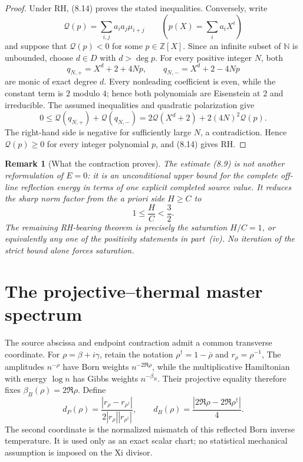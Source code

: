 \documentclass[11pt]{article}
\newtheorem{remark}[theorem]{Remark}
\begin{document}
\begin{proof}
Under RH, (8.14) proves the stated inequalities.  Conversely, write
\[
 \mathcal Q(p)=\sum_{i,j}a_i a_j\mu_{i+j}
 \qquad\left(p(X)=\sum_i a_iX^i\right)
\]
and suppose that $\mathcal Q(p)<0$ for some $p\in\mathbb Z[X]$.  Since an infinite subset of
$\mathbb N$ is unbounded, choose $d\in D$ with $d>\deg p$.  For every positive integer $N$, both
\[
 q_{N,+}=X^d+2+4Np,\qquad q_{N,-}=X^d+2-4Np
\]
are monic of exact degree $d$.  Every nonleading coefficient is even, while the constant term is
$2$ modulo $4$; hence both polynomials are Eisenstein at $2$ and irreducible.  The assumed
inequalities and quadratic polarization give
\[
 0\le \mathcal Q(q_{N,+})+\mathcal Q(q_{N,-})
   =2\mathcal Q(X^d+2)+2(4N)^2\mathcal Q(p).
\]
The right-hand side is negative for sufficiently large $N$, a contradiction.  Hence
$\mathcal Q(p)\ge0$ for every integer polynomial $p$, and (8.14) gives RH.
\end{proof}

\begin{remark}[What the contraction proves]
\label{rem:contraction-boundary}
The estimate \textup{(8.9)} is not another reformulation of $E=0$: it is an unconditional upper
bound for the complete off-line reflection energy in terms of one explicit completed source
value.  It reduces the sharp norm factor from the a priori side $H\ge C$ to
\[
 1\le\frac HC<\frac32.
\]
The remaining RH-bearing theorem is precisely the saturation $H/C=1$, or equivalently any one
of the positivity statements in part~\textup{(iv)}.  No iteration of the strict bound alone forces
saturation.
\end{remark}

\section{The projective--thermal master spectrum}
\label{sec:projective-thermal}

The source abscissa and endpoint contraction admit a common transverse coordinate.  For
$\rho=\beta+i\gamma$, retain the notation $\rho^\dagger=1-\overline\rho$ and $r_\rho=\rho^{-1}$,
The amplitudes $n^{-\rho}$ have Born weights $n^{-2\Re\rho}$, while the multiplicative
Hamiltonian with energy $\log n$ has Gibbs weights $n^{-\beta_B}$.  Their projective equality
therefore fixes $\beta_B(\rho)=2\Re\rho$.  Define
\[
 d_P(\rho)=\frac{|r_\rho-r_{\rho^\dagger}|}
 {2|r_\rho||r_{\rho^\dagger}|},
 \qquad
 d_B(\rho)=\frac{|2\Re\rho-2\Re\rho^\dagger|}{4}.
 \tag{9.1}
\]
The second coordinate is the normalized mismatch of this reflected Born inverse temperature.  It
is used only as an exact scalar chart; no statistical mechanical assumption is imposed on the Xi
divisor.
\end{document}
